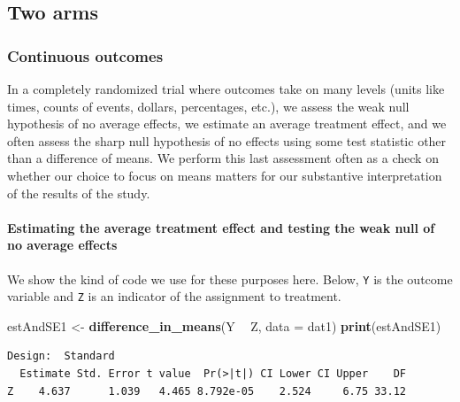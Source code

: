 \documentclass[
  12pt,
]{book}
\newenvironment{Shaded}{\begin{snugshade}}{\end{snugshade}}
\newcommand{\DataTypeTok}[1]{\textcolor[rgb]{0.13,0.29,0.53}{#1}}
\newcommand{\KeywordTok}[1]{\textcolor[rgb]{0.13,0.29,0.53}{\textbf{#1}}}
\newcommand{\NormalTok}[1]{#1}
\newcommand{\OperatorTok}[1]{\textcolor[rgb]{0.81,0.36,0.00}{\textbf{#1}}}
\newcommand{\StringTok}[1]{\textcolor[rgb]{0.31,0.60,0.02}{#1}}
\let\oldparagraph\paragraph
\renewcommand{\paragraph}[1]{\oldparagraph{#1}\mbox{}}
\theoremstyle{definition}
\theoremstyle{definition}
\theoremstyle{definition}
\theoremstyle{remark}
\begin{document}
\hypertarget{two-arms}{%
\subsection{Two arms}\label{two-arms}}

\hypertarget{continuous-outcomes}{%
\subsubsection{Continuous outcomes}\label{continuous-outcomes}}

In a completely randomized trial where outcomes take on many levels
(units like times, counts of events, dollars, percentages, etc.), we
assess the weak null hypothesis of no average effects, we estimate an
average treatment effect, and we often assess the sharp null hypothesis
of no effects using some test statistic other than a difference of
means. We perform this last assessment often as a check on whether our
choice to focus on means matters for our substantive interpretation of
the results of the study.

\hypertarget{estimating-the-average-treatment-effect-and-testing-the-weak-null-of-no-average-effects}{%
\paragraph{Estimating the average treatment effect and testing the weak
null of no average
effects}\label{estimating-the-average-treatment-effect-and-testing-the-weak-null-of-no-average-effects}}

We show the kind of code we use for these purposes here. Below,
\texttt{Y} is the outcome variable and \texttt{Z} is an indicator of the
assignment to treatment.

\begin{Shaded}
\begin{Highlighting}[]
\NormalTok{estAndSE1 <-}\StringTok{ }\KeywordTok{difference_in_means}\NormalTok{(Y }\OperatorTok{~}\StringTok{ }\NormalTok{Z, }\DataTypeTok{data =}\NormalTok{ dat1)}
\KeywordTok{print}\NormalTok{(estAndSE1)}
\end{Highlighting}
\end{Shaded}

\begin{verbatim}
Design:  Standard 
  Estimate Std. Error t value  Pr(>|t|) CI Lower CI Upper    DF
Z    4.637      1.039   4.465 8.792e-05    2.524     6.75 33.12
\end{verbatim}
\end{document}
